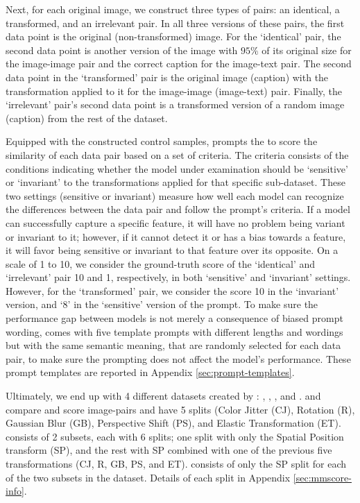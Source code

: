 Next, for each original image, we construct three types of pairs: an identical, a transformed, and an irrelevant pair. In all three versions of these pairs, the first data point is the original (non-transformed) image. For the `identical' pair, the second data point is another version of the image with $95\%$ of its original size for the image-image pair and the correct caption for the image-text pair. The second data point in the `transformed' pair is the original image (caption) with the transformation applied to it for the image-image (image-text) pair. Finally, the `irrelevant' pair's second data point is a transformed version of a random image (caption) from the rest of the dataset. 

Equipped with the constructed control samples, \mmscore{} prompts the \model{} to score the similarity of each data pair based on a set of criteria. 
The criteria consists of the conditions indicating whether the model under examination should be `sensitive' or `invariant' to the transformations applied for that specific sub-dataset. These two settings (sensitive or invariant) measure how well each model can recognize the differences between the data pair and follow the prompt's criteria. If a model can successfully capture a specific feature, it will have no problem being variant or invariant to it; however, if it cannot detect it or has a bias towards a feature, it will favor being sensitive or invariant to that feature over its opposite. On a scale of 1 to 10, we consider the ground-truth score of the `identical' and `irrelevant' pair 10 and 1, respectively, in both `sensitive' and `invariant' settings. However, for the `transformed' pair, we consider the score 10 in the `invariant' version, and `8' in the `sensitive' version of the prompt. 
To make sure the performance gap between models is not merely a consequence of biased prompt wording, \mmscore{} comes with five template prompts with different lengths and wordings but with the same semantic meaning, that are randomly selected for each data pair, to make sure the prompting does not affect the model's performance. These prompt templates are reported in Appendix \ref{sec:prompt-templates}.

Ultimately, we end up with 4 different datasets created by \mmscore: \mmscorecoco{}, \mmscorein{}, \mmscorewuimgimg{}, and \mmscorewuimgtext{}. \mmscorecoco{} and \mmscorein{} compare and score image-pairs and have 5 splits (Color Jitter (CJ), Rotation (R), Gaussian Blur (GB), Perspective Shift (PS), and Elastic Transformation (ET). \mmscorewuimgimg{} consists of 2 subsets, each with 6 splits; one split with only the Spatial Position transform (SP), and the rest with SP combined with one of the previous five transformations (CJ, R, GB, PS, and ET). \mmscorewuimgtext{} consists of only the SP split for each of the two subsets in the \wu{} dataset. Details of each split in Appendix \ref{sec:mmscore-info}.

